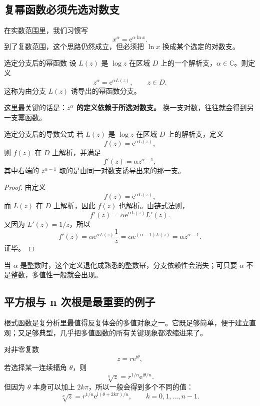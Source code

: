 \subsection{复幂函数必须先选对数支}

在实数范围里，我们习惯写
\[
    x^\alpha=\mathrm{e}^{\alpha\ln x}.
\]
到了复数范围，这个思路仍然成立，但必须把 $\ln x$ 换成某个选定的对数支。

\begin{dingliyi}{选定分支后的幂函数}{}
设 $L(z)$ 是 $\log z$ 在区域 $D$ 上的一个解析支，$\alpha\in\mathbb{C}$。则定义
\[
    z^\alpha=\mathrm{e}^{\alpha L(z)},\qquad z\in D.
\]
这称为由分支 $L(z)$ 诱导出的幂函数分支。
\end{dingliyi}

\begin{zhu}{}{}
这里最关键的话是：\textbf{$z^\alpha$ 的定义依赖于所选对数支。} 换一支对数，往往就会得到另一支幂函数。
\end{zhu}

\begin{dingli}{选定分支后的导数公式}{}
若 $L(z)$ 是 $\log z$ 在区域 $D$ 上的解析支，定义
\[
    f(z)=\mathrm{e}^{\alpha L(z)},
\]
则 $f(z)$ 在 $D$ 上解析，并满足
\[
    f'(z)=\alpha z^{\alpha-1},
\]
其中右端的 $z^{\alpha-1}$ 取的是由同一对数支诱导出来的那一支。
\end{dingli}

\begin{proof}
由定义
\[
    f(z)=\mathrm{e}^{\alpha L(z)},
\]
而 $L(z)$ 在 $D$ 上解析，因此 $f(z)$ 也解析。由链式法则，
\[
    f'(z)=\alpha \mathrm{e}^{\alpha L(z)}L'(z).
\]
又因为 $L'(z)=1/z$，所以
\[
    f'(z)=\alpha \mathrm{e}^{\alpha L(z)}\frac{1}{z}
    =\alpha \mathrm{e}^{(\alpha-1)L(z)}
    =\alpha z^{\alpha-1}.
\]
证毕。
\end{proof}

\begin{zhu}{}{}
当 $\alpha$ 是整数时，这个定义退化成熟悉的整数幂，分支依赖性会消失；可只要 $\alpha$ 不是整数，多值性一般就会出现。
\end{zhu}

\subsection{平方根与 n 次根是最重要的例子}

根式函数是复分析里最值得反复体会的多值对象之一。它既足够简单，便于建立直观；又足够典型，几乎把多值函数的所有关键现象都浓缩进来了。

对非零复数
\[
    z=r\mathrm{e}^{\mathrm{i}\theta},
\]
若选择某一连续辐角 $\theta$，则
\[
    \sqrt[n]{z}=r^{1/n}\mathrm{e}^{\mathrm{i}\theta/n}.
\]
但因为 $\theta$ 本身可以加上 $2k\pi$，所以一般会得到多个不同的值：
\[
    \sqrt[n]{z}
    =
    r^{1/n}\mathrm{e}^{\mathrm{i}(\theta+2k\pi)/n},
    \qquad k=0,1,\dots,n-1.
\]

